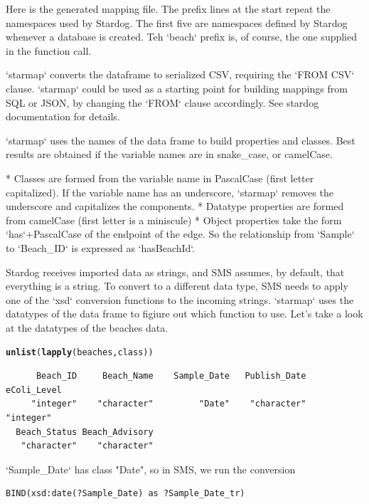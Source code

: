 \documentclass{article}\usepackage[]{graphicx}\usepackage[]{xcolor}
\makeatletter
\newcommand{\hlstd}[1]{\textcolor[rgb]{0.345,0.345,0.345}{#1}}%
\newcommand{\hlkwd}[1]{\textcolor[rgb]{0.737,0.353,0.396}{\textbf{#1}}}%
\newenvironment{kframe}{%
 \def\at@end@of@kframe{}%
 \ifinner\ifhmode%
  \def\at@end@of@kframe{\end{minipage}}%
  \begin{minipage}{\columnwidth}%
 \fi\fi%
 \def\FrameCommand##1{\hskip\@totalleftmargin \hskip-\fboxsep
 \colorbox{shadecolor}{##1}\hskip-\fboxsep
     \hskip-\linewidth \hskip-\@totalleftmargin \hskip\columnwidth}%
 \MakeFramed {\advance\hsize-\width
   \@totalleftmargin\z@ \linewidth\hsize
   \@setminipage}}%
 {\par\unskip\endMakeFramed%
 \at@end@of@kframe}
\newenvironment{knitrout}{}{} %
\makeatother
\begin{document}
Here is the generated mapping file. The prefix lines at the start repeat the namespaces used by Stardog. The first five are namespaces defined by Stardog whenever a database is created. Teh `beach` prefix is, of course, the one supplied in the function call.

`starmap` converts the dataframe to serialized CSV, requiring the `FROM CSV` clause. `starmap` could be used as a starting point for building mappings from SQL or JSON, by changing the `FROM` clause accordingly. See stardog documentation for details.

`starmap` uses the names of the data frame to build properties and classes. Best results are obtained if the variable names are in snake\_case, or camelCase.

* Classes are formed from the variable name in PascalCase (first letter capitalized). If the variable name has an underscore, `starmap` removes the underscore and capitalizes the components.
* Datatype properties are formed from camelCase (first letter is a miniscule)
* Object properties take the form `has`+PascalCase of the endpoint of the edge. So the relationship from `Sample` to `Beach\_ID` is expressed as `hasBeachId`.


Stardog receives imported data as strings, and SMS assumes, by default, that everything is a string. To convert to a different data type, SMS needs to apply one of the `xsd` conversion functions to the incoming strings. `starmap` uses the datatypes of the data frame to figiure out which function to use. Let's take a look at the datatypes of the beaches data.

\begin{knitrout}
\color{fgcolor}\begin{kframe}
\begin{alltt}
\hlkwd{unlist}\hlstd{(}\hlkwd{lapply}\hlstd{(beaches, class))}
\end{alltt}
\begin{verbatim}
      Beach_ID     Beach_Name    Sample_Date   Publish_Date    eColi_Level 
     "integer"    "character"         "Date"    "character"      "integer" 
  Beach_Status Beach_Advisory 
   "character"    "character" 
\end{verbatim}
\end{kframe}
\end{knitrout}


`Sample\_Date` has class "Date", so in SMS, we run the conversion \begin{verbatim}BIND(xsd:date(?Sample_Date) as ?Sample_Date_tr)\end{verbatim}
\end{document}
